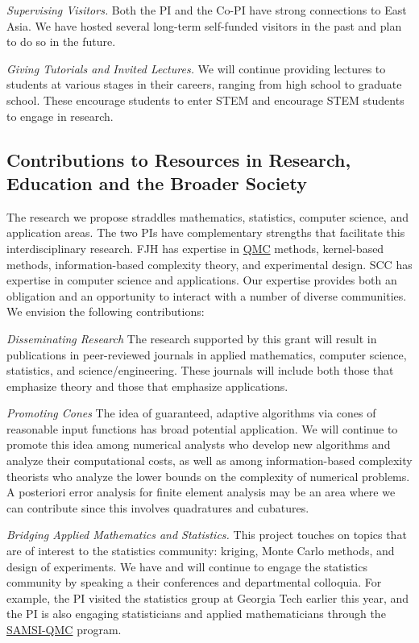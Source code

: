\documentclass[11pt]{NSFamsart}
\newcommand{\QMC}{\hyperlink{QMClink}{QMC}\xspace}
\newcommand{\SAMSIQMC}{\hyperlink{SAMSIlink}{SAMSI-QMC}\xspace}
\begin{document}
\emph{Supervising Visitors.}
Both the PI and the Co-PI have strong connections to East Asia.  We have hosted several long-term 
self-funded visitors in the past and plan to do so in the future.

\emph{Giving Tutorials and Invited Lectures.}
We will continue providing lectures to students at various stages in their careers, ranging from high 
school to graduate school. These encourage students to enter STEM and encourage STEM students 
to engage in research.


\subsection{Contributions to Resources in Research, Education and the Broader Society} 
\label{BroaderTwoSec}

The research we propose straddles mathematics, statistics, computer science, and application 
areas.  The two PIs have complementary strengths that facilitate this interdisciplinary research.  FJH 
has expertise in \QMC methods, kernel-based methods, information-based complexity 
theory, and experimental design. SCC has expertise in computer science and applications.  Our 
expertise provides both an obligation and an opportunity to interact with a number of diverse 
communities. We envision the following contributions:

\emph{Disseminating Research}
The research supported by this grant will result in publications in peer-reviewed journals in applied 
mathematics, computer science, statistics, and science/engineering. These 
journals will include both those that emphasize theory and those that emphasize applications.

\emph{Promoting Cones} The idea of guaranteed, adaptive algorithms via cones of reasonable input 
functions 
has broad potential application.  We will continue to promote this idea among numerical analysts 
who 
develop new algorithms and analyze their computational costs, as well as among information-based 
complexity theorists who analyze the lower bounds on the complexity of numerical problems.  A 
posteriori error analysis for finite element analysis may be an area where we can contribute since 
this involves quadratures and cubatures.

\emph{Bridging Applied Mathematics and Statistics.}
This project touches on topics that are of interest to the statistics community: kriging, Monte Carlo 
methods, and design of experiments.  We have and will continue to engage the statistics community 
by speaking a their conferences and departmental colloquia.  For example, the PI visited the 
statistics group at Georgia Tech earlier this year, and the PI is also engaging statisticians and 
applied mathematicians through the \SAMSIQMC program.
\end{document}
